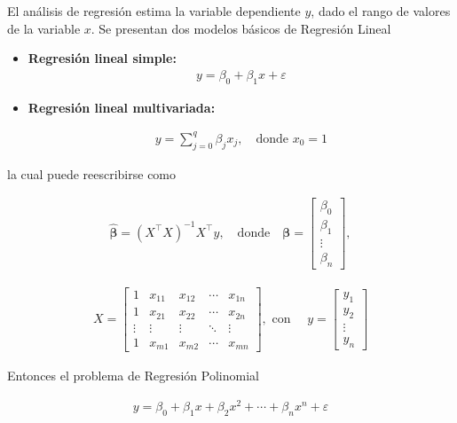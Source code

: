 \documentclass[12pt]{article}
\begin{document}
El análisis de regresión estima la variable dependiente \( y \), dado el rango de valores de la variable \( x \). Se presentan dos modelos b\'asicos de Regresi\'on Lineal

\begin{itemize} 

\item \textbf{Regresión lineal simple:}
\begin{eqnarray*}
y = \beta_0 + \beta_1 x + \varepsilon
\end{eqnarray*}
    
\item \textbf{Regresión lineal multivariada:}

\begin{eqnarray*}
y = \sum_{j=0}^{q} \beta_j x_j, \quad \text{donde } x_0 = 1
\end{eqnarray*}

\end{itemize}

la cual puede reescribirse como

\begin{eqnarray*}
\hat{\boldsymbol{\beta}} = (X^\top X)^{-1} X^\top y, \quad \text{donde} \quad
\boldsymbol{\beta} =
\begin{bmatrix}
\beta_0 \\
\beta_1 \\
\vdots \\
\beta_n
\end{bmatrix},
\end{eqnarray*}

\begin{eqnarray*}
X =
\begin{bmatrix}
1 & x_{11} & x_{12} & \cdots & x_{1n} \\
1 & x_{21} & x_{22} & \cdots & x_{2n} \\
\vdots & \vdots & \vdots & \ddots & \vdots \\
1 & x_{m1} & x_{m2} & \cdots & x_{mn}
\end{bmatrix},\textrm{ con }
\quad
y =
\begin{bmatrix}
y_1 \\
y_2 \\
\vdots \\
y_n
\end{bmatrix}
\end{eqnarray*}

Entonces el problema de Regresión Polinomial

\begin{eqnarray*}
y = \beta_0 + \beta_1 x + \beta_2 x^2 + \cdots + \beta_n x^n + \varepsilon
\end{eqnarray*}
\end{document}
